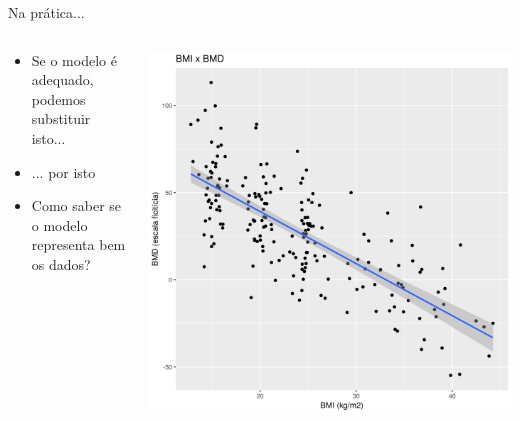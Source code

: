 \documentclass{beamer}
\begin{document}
\begin{frame}{Na prática...}
  \begin{columns}
    \begin{column}{5cm}
      \begin{itemize}
        \small
      \item \alert{Se o modelo é adequado}, podemos substituir isto...
        \bigskip
      \item<0> ... por isto
        \bigskip
      \item<0> Como saber se o modelo representa bem os dados?
      \end{itemize}
    \end{column}
    \begin{column}{5cm}
      \begin{center}
        \includegraphics[width=1.1\textwidth]{Cap18-19/pratica-plot2}
      \end{center}
    \end{column}
  \end{columns}
\end{frame}
\end{document}
